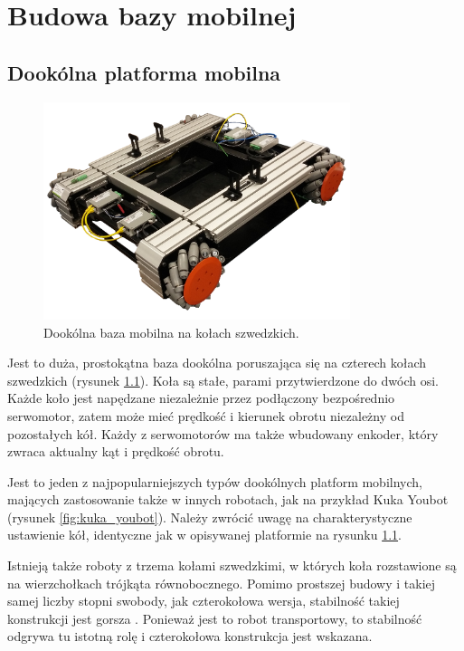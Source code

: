 \chapter{Budowa bazy mobilnej}
\label{sec:robot}
\section{Dookólna platforma mobilna}
	\begin{figure}[H]
	\centering
	\includegraphics[width=0.8\textwidth]{graphics/base_photo.png}
	\caption{Dookólna baza mobilna na kołach szwedzkich.}
	\label{fig:base_photo}
	\end{figure} 

	Jest to duża, prostokątna baza dookólna poruszająca się na czterech kołach szwedzkich (rysunek \ref{fig:base_photo}).
	Koła są stałe, parami przytwierdzone do dwóch osi.
	Każde koło jest napędzane niezależnie przez podłączony bezpośrednio serwomotor, 
	zatem może mieć prędkość i kierunek obrotu niezależny od pozostałych kół.
	Każdy z serwomotorów ma także wbudowany enkoder, który zwraca aktualny kąt i prędkość obrotu.

	Jest to jeden z najpopularniejszych typów dookólnych platform mobilnych, mających zastosowanie także w innych robotach, jak na przykład Kuka Youbot (rysunek \ref{fig:kuka_youbot}).
	Należy zwrócić uwagę na charakterystyczne ustawienie kół, identyczne jak w opisywanej platformie na rysunku \ref{fig:base_photo}.
	
	Istnieją także roboty z trzema kołami szwedzkimi, w których koła rozstawione są na wierzchołkach trójkąta równobocznego.
	Pomimo prostszej budowy i takiej samej liczby stopni swobody, jak czterokołowa wersja, stabilność takiej konstrukcji jest gorsza \cite{extra_axis}.
	Ponieważ jest to robot transportowy, to stabilność odgrywa tu istotną rolę i czterokołowa konstrukcja jest wskazana.

